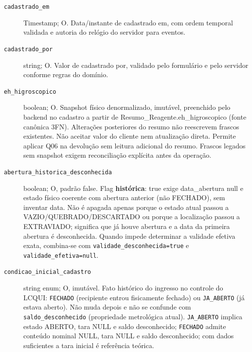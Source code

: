 \begin{description}
\item[\texttt{cadastrado\_em}] Timestamp; O. Data/instante de cadastrado em, com ordem temporal validada e autoria do relógio do servidor para eventos.
\item[\texttt{cadastrado\_por}] string; O. Valor de cadastrado por, validado pelo formulário e pelo servidor conforme regras do domínio.
\item[\texttt{eh\_higroscopico}] boolean; O. Snapshot físico denormalizado, imutável, preenchido pelo backend no cadastro a partir de Resumo\_Reagente.eh\_higroscopico (fonte canônica 3FN). Alterações posteriores do resumo não reescrevem frascos existentes. Não aceitar valor do cliente nem atualização direta. Permite aplicar Q06 na devolução sem leitura adicional do resumo. Frascos legados sem snapshot exigem reconciliação explícita antes da operação.
\item[\texttt{abertura\_historica\_desconhecida}] boolean; O, padrão false. Flag \textbf{histórica}: true exige data\_abertura null e estado físico coerente com abertura anterior (não FECHADO), sem inventar data. Não é apagada apenas porque o estado atual passou a VAZIO/QUEBRADO/DESCARTADO ou porque a localização passou a EXTRAVIADO; significa que já houve abertura e a data da primeira abertura é desconhecida. Quando impede determinar a validade efetiva exata, combina-se com \texttt{validade\_desconhecida=true} e \texttt{validade\_efetiva=null}.
\item[\texttt{condicao\_inicial\_cadastro}] string enum; O, imutável. Fato histórico do ingresso no controle do LCQUI: \texttt{FECHADO} (recipiente entrou fisicamente fechado) ou \texttt{JA\_ABERTO} (já estava aberto). Não muda depois e não se confunde com \texttt{saldo\_desconhecido} (propriedade metrológica atual). \texttt{JA\_ABERTO} implica estado ABERTO, tara NULL e saldo desconhecido; \texttt{FECHADO} admite conteúdo nominal NULL, tara NULL e saldo desconhecido; com dados suficientes a tara inicial é referência teórica.
\end{description}

